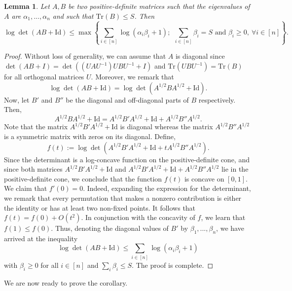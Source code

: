 \documentclass[12pt]{article}
\def \Tr {\mathrm{Tr}}
\def \Id {\mathrm{Id}}
\newtheorem{lemma}[theorem]{Lemma}
\theoremstyle{definition}
\theoremstyle{remark}
\begin{document}
\begin{lemma} \label{lem:diag}
Let $A,B$ be two positive-definite matrices such that the eigenvalues of $A$ are $\alpha_1,...,\alpha_n$ and such that $\Tr(B) \leq S$. Then
$$
\log \det (AB + \Id) \leq \max \left \{ \sum_{i \in [n]} \log (\alpha_i \beta_i + 1); ~~ \sum_{i \in [n]} \beta_i = S \mbox{ and } \beta_i \geq 0, ~ \forall i \in [n]  \right \}.
$$
\end{lemma}
\begin{proof}
Without loss of generality, we can assume that $A$ is diagonal since $\det (AB + I) = \det ((U A U^{-1}) U B U^{-1} + I)$ and $\Tr(U B U^{-1}) = \Tr(B)$ for all orthogonal matrices $U$. Moreover, we remark that
$$
\log \det (AB + \Id) = \log \det (A^{1/2} B A^{1/2} + \Id).
$$
Now, let $B'$ and $B''$ be the diagonal and off-diagonal parts of $B$ respectively. Then,
$$
A^{1/2} B A^{1/2} + \Id = A^{1/2} B' A^{1/2} + \Id + A^{1/2} B'' A^{1/2}.
$$
Note that the matrix $A^{1/2} B' A^{1/2} + \Id$ is diagonal whereas the matrix $A^{1/2} B'' A^{1/2}$ is a symmetric matrix with zeros on its diagonal. Define,
$$
f(t) := \log \det \left ( A^{1/2} B' A^{1/2} + \Id + t A^{1/2} B'' A^{1/2} \right ).
$$
Since the determinant is a log-concave function on the positive-definite cone, and since both matrices $A^{1/2} B' A^{1/2} + \Id$ and $A^{1/2} B' A^{1/2} + \Id + A^{1/2} B'' A^{1/2}$ lie in the positive-definite cone, we conclude that the function $f(t)$ is concave on $[0,1]$. We claim that $f'(0) = 0$. Indeed, expanding the expression for the determinant, we remark that every permutation that makes a nonzero contribution is either the identity or has at least two non-fixed points. It follows that $f(t) = f(0) + O(t^2)$. In conjunction with the concavity of $f$, we learn that $f(1) \leq f(0)$. Thus, denoting the diagonal values of $B'$ by $\beta_1,...,\beta_n$, we have arrived at the inequality
$$
\log \det \left ( A B + \Id \right ) \leq \sum_{i \in [n]} \log(\alpha_i \beta_i + 1)
$$
with $\beta_i \geq 0$ for all $i \in [n]$ and $\sum_i \beta_i \leq S$. The proof is complete.
\end{proof}
	
We are now ready to prove the corollary.	
\end{document}
